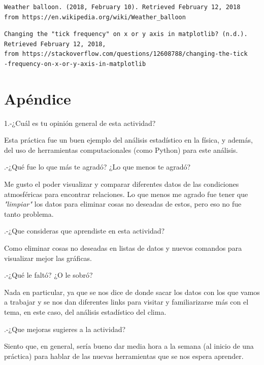 \documentclass{article}
\begin{document}
\begin{verbatim}
Weather balloon. (2018, February 10). Retrieved February 12, 2018 
from https://en.wikipedia.org/wiki/Weather_balloon 
\end{verbatim}

\begin{verbatim}
Changing the "tick frequency" on x or y axis in matplotlib? (n.d.). 
Retrieved February 12, 2018, 
from https://stackoverflow.com/questions/12608788/changing-the-tick
-frequency-on-x-or-y-axis-in-matplotlib
\end{verbatim}


\section{Apéndice}

 

    1.-¿Cuál es tu opinión general de esta actividad?
    
    \vspace{0.3cm}
    Esta práctica fue un buen ejemplo del análisis estadístico en la física, y además, del uso de herramientas computacionales (como Python) para este análisis.
    \vspace{0.3cm}
    
.-¿Qué fue lo que más te agradó? ¿Lo que menos te agradó?
    
    \vspace{0.3cm}
    Me gusto el poder visualizar y comparar diferentes datos de las condiciones atmosféricas para encontrar relaciones. Lo que menos me agrado fue tener que \textit{"limpiar"} los datos para eliminar cosas no deseadas de estos, pero eso no fue tanto problema.
    \vspace{0.3cm}
    
.-¿Que consideras que aprendiste en esta actividad? 
    
    \vspace{0.3cm}
    Como eliminar cosas no deseadas en listas de datos y nuevos comandos para visualizar mejor las gráficas.
    \vspace{0.3cm}
    
.-¿Qué le faltó? ¿O le sobró?   
    
    \vspace{0.3cm}
    Nada en particular, ya que se nos dice de donde sacar los datos con los que vamos a trabajar y se nos dan diferentes links para visitar y familiarizarse más con el tema, en este caso, del análisis estadístico del clima.
    \vspace{0.3cm}
    
.-¿Que mejoras sugieres a la actividad?
    
    \vspace{0.3cm}
    Siento que, en general, sería bueno dar media hora a la semana (al inicio de una práctica) para hablar de las nuevas herramientas que se nos espera aprender.
    \vspace{0.3cm}
    
\end{document}
